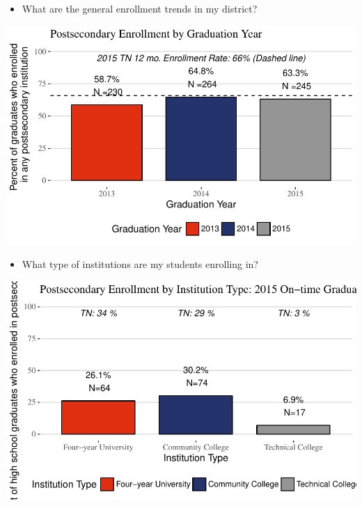 \documentclass[11pt,]{article}
\providecommand{\tightlist}{%
  \setlength{\itemsep}{0pt}\setlength{\parskip}{0pt}}
\begin{document}
\begin{itemize}
\tightlist
\item
  What are the general enrollment trends in my district?
\end{itemize}

\begin{center}\includegraphics{20170411_PSWRR_no_CTE_files/figure-latex/Enrollment over time-1} \end{center}

\begin{itemize}
\tightlist
\item
  What type of institutions are my students enrolling in?
\end{itemize}

\begin{center}\includegraphics{20170411_PSWRR_no_CTE_files/figure-latex/District by Type-1} \end{center}

\newpage
\end{document}
